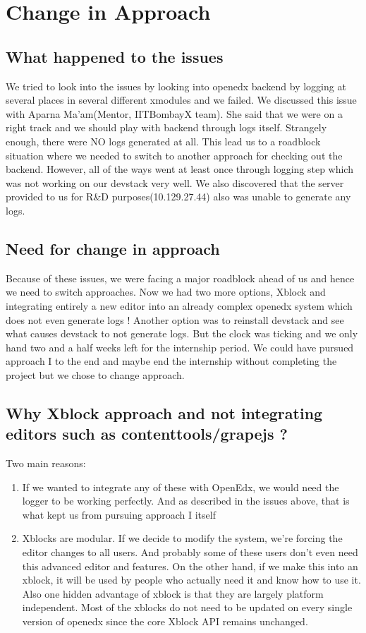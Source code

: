 \section{Change in Approach}
\subsection{What happened to the issues}
We tried to look into the issues by looking into openedx backend by logging at several places in
several different xmodules and we failed. We discussed this issue with Aparna Ma’am(Mentor,
IITBombayX team). She said that we were on a right track and we should play with backend
through logs itself. Strangely enough, there were NO logs generated at all. This lead us to a
roadblock situation where we needed to switch to another approach for checking out the backend.
However, all of the ways went at least once through logging step which was not working on our
devstack very well. We also discovered that the server provided to us for R\&D
purposes(10.129.27.44) also was unable to generate any logs.
\subsection{Need for change in approach}
Because of these issues, we were facing a major roadblock ahead of us and hence we need to
switch approaches. Now we had two more options, Xblock and integrating entirely a new editor into
an already complex openedx system which does not even generate logs ! Another option was to
reinstall devstack and see what causes devstack to not generate logs. But the clock was ticking and
we only hand two and a half weeks left for the internship period. We could have pursued approach I to the end
and maybe end the internship without completing the project but we chose to change approach.
\subsection{Why Xblock approach and not integrating editors such as
contenttools/grapejs ?}
Two main reasons:
\begin{enumerate}
\item If we wanted to integrate any of these with OpenEdx, we would need the logger to be working
perfectly. And as described in the issues above, that is what kept us from pursuing approach I itself
\item Xblocks are modular. If we decide to modify the system, we’re forcing the editor changes to all
users. And probably some of these users don’t even need this advanced editor and features. On the
other hand, if we make this into an xblock, it will be used by people who actually need it and know
how to use it. Also one hidden advantage of xblock is that they are largely platform independent.
Most of the xblocks do not need to be updated on every single version of openedx since the core
Xblock API remains unchanged.
\end{enumerate}


